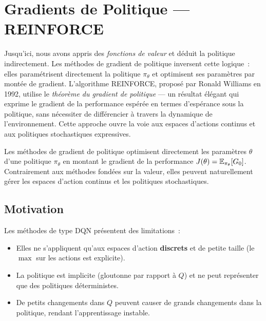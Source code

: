 \chapter{Gradients de Politique --- REINFORCE}
\label{ch:gradient_politique}

Jusqu'ici, nous avons appris des \emph{fonctions de valeur} et d\'eduit la politique indirectement. Les m\'ethodes de gradient de politique inversent cette logique~: elles param\'etrisent directement la politique $\pi_\theta$ et optimisent ses param\`etres par mont\'ee de gradient. L'algorithme REINFORCE, propos\'e par Ronald Williams en 1992, utilise le \emph{th\'eor\`eme du gradient de politique} --- un r\'esultat \'el\'egant qui exprime le gradient de la performance esp\'er\'ee en termes d'esp\'erance sous la politique, sans n\'ecessiter de diff\'erencier \`a travers la dynamique de l'environnement. Cette approche ouvre la voie aux espaces d'actions continus et aux politiques stochastiques expressives.

\begin{intuition}
Les m\'ethodes de gradient de politique optimisent directement les param\`etres
$\theta$ d'une politique $\pi_\theta$ en montant le gradient de la performance
$J(\theta) = \mathbb{E}_{\pi_\theta}[G_0]$. Contrairement aux m\'ethodes fond\'ees
sur la valeur, elles peuvent naturellement g\'erer les espaces d'action continus
et les politiques stochastiques.
\end{intuition}

\section{Motivation}

Les m\'ethodes de type DQN pr\'esentent des limitations~:
\begin{itemize}
    \item Elles ne s'appliquent qu'aux espaces d'action \textbf{discrets} et de
    petite taille (le $\max$ sur les actions est explicite).
    \item La politique est implicite (gloutonne par rapport \`a $Q$) et ne peut
    repr\'esenter que des politiques d\'eterministes.
    \item De petits changements dans $Q$ peuvent causer de grands changements
    dans la politique, rendant l'apprentissage instable.
\end{itemize}

